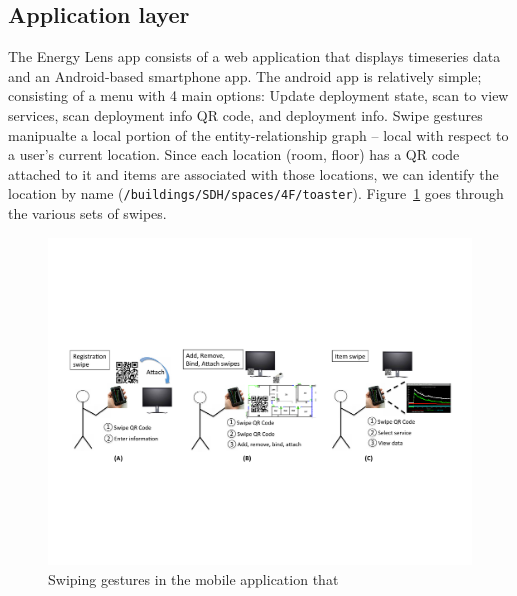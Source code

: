 






\subsection{Application layer}
The Energy Lens app consists of a web application that displays timeseries data and an Android-based smartphone
app.
The android app is relatively simple; consisting of a menu with 4 main options: Update deployment state, scan to view services,
scan deployment info QR code, and deployment info.
Swipe gestures manipualte a local portion of the entity-relationship graph -- local with respect to a user's current location.
Since each location (room, floor) has a QR code attached to it and items are associated with those locations, we
can identify the location by name ({\tt /buildings/SDH/spaces/4F/toaster}).  Figure~\ref{fig:swipes} goes through the various sets 
of swipes.


\begin{figure}[htb!]
\begin{center}
\includegraphics[width=\textwidth]{figs/swipes}
\caption{Swiping gestures in the mobile application that }
\label{fig:swipes}
\end{center}
\end{figure}

